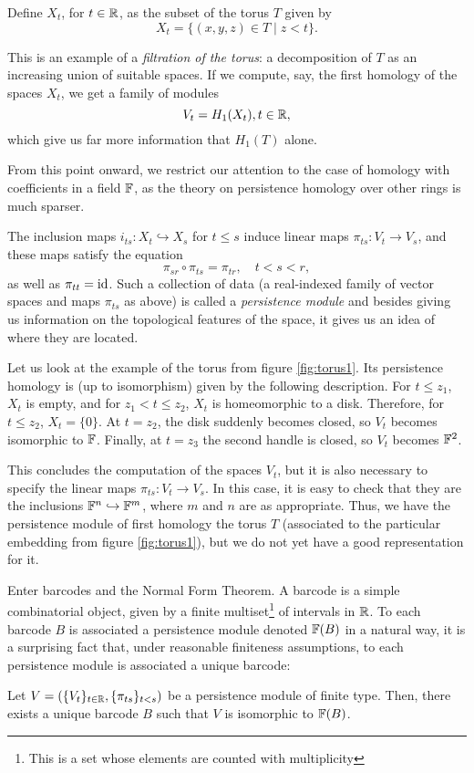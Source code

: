 Define $X_t$, for $t \in \mathbb{R}$, as the subset of the torus $T$ given by
\begin{equation}
X_t = \{ (x,y,z) \in T \mid z < t \}.
\end{equation}

This is an example of a \emph{filtration of the torus}: a decomposition of $T$ as an increasing union of suitable spaces. If we compute, say, the first homology of the spaces $X_t$, we get a family of modules
\begin{equation}
V_t = H_1(X_t), t \in \mathbb{R},
\end{equation}
which give us far more information that $H_1(T)$ alone.

From this point onward, we restrict our attention to the case of homology with coefficients in a field $\mathbb{F}$, as the theory on persistence homology over other rings is much sparser.

The inclusion maps $i_{ts} \colon X_t \hookrightarrow X_s$ for $t \leq s$ induce linear maps $\pi_{ts} \colon V_t \to V_s$, and these maps satisfy the equation
\begin{equation}
\pi_{sr} \circ \pi_{ts} = \pi_{tr}, \quad t < s < r,
\end{equation}
as well as $\pi_{tt} = \mathrm{id}$. Such a collection of data (a real-indexed family of vector spaces and maps $\pi_{ts}$ as above) is called a \emph{persistence module} and besides giving us information on the topological features of the space, it gives us an idea of where they are located.

Let us look at the example of the torus from figure \ref{fig:torus1}. Its persistence homology is (up to isomorphism) given by the following description. For $t \leq z_1$, $X_t$ is empty, and for $z_1 < t \leq z_2$, $X_t$ is homeomorphic to a disk. Therefore, for $t \leq z_2$, $X_t = \{0\}$. At $t = z_2$, the disk suddenly becomes closed, so $V_t$ becomes isomorphic to $\mathbb{F}$. Finally, at $t = z_3$ the second handle is closed, so $V_t$ becomes $\mathbb{F}^2$.

This concludes the computation of the spaces $V_t$, but it is also necessary to specify the linear maps $\pi_{ts} \colon V_t \to V_s$. In this case, it is easy to check that they are the inclusions $\mathbb{F}^n \hookrightarrow \mathbb{F}^m$, where $m$ and $n$ are as appropriate. Thus, we have the persistence module of first homology the torus $T$ (associated to the particular embedding from figure \ref{fig:torus1}), but we do not yet have a good representation for it.

Enter barcodes and the Normal Form Theorem. A barcode is a simple combinatorial object, given by a finite multiset\footnote{This is a set whose elements are counted with multiplicity} of intervals in $\mathbb{R}$. To each barcode $B$ is associated a persistence module denoted $\mathbb{F}(B)$ in a natural way, it is a surprising fact that, under reasonable finiteness assumptions, to each persistence module is associated a unique barcode:
\begin{theorem*}
Let $V = (\{V_t\}_{t \in \mathbb{R}}, \{\pi_{ts}\}_{t<s})$ be a persistence module of finite type. Then, there exists a unique barcode $B$ such that $V$ is isomorphic to $\mathbb{F}(B)$.
\end{theorem*}

